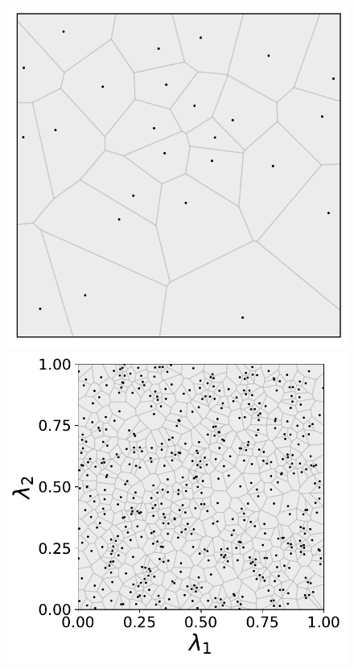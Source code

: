 \begin{figure}[ht]
\centering
	\begin{minipage}{.275\textwidth}
		\includegraphics[width=\linewidth]{./images/voronoi_diagrams/voronoi_diagram_N25_r0_no_label}
	\end{minipage}
	\begin{minipage}{.4\textwidth}
		\includegraphics[width=\linewidth]{./images/voronoi_diagrams/voronoi_diagram_N500_r50}

\end{minipage}
\end{figure}
